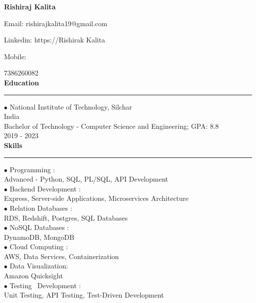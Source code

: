 \documentclass[11pt,a4paper]{article}
\renewcommand{\section}[1]{%
  \vspace{12pt}%
  {\large\bfseries #1}%
  \vspace{6pt}%
  \hrule%
  \vspace{6pt}%
}
\begin{document}
\begin{center}\Huge\textbf{Rishiraj Kalita}\\[0.5cm]\end{center}

\begin{center}Email: rishirajkalita19@gmail.com\end{center}
\begin{center}Linkedin: https://Rishirak Kalita\end{center}
\begin{center}Mobile:\end{center}
7386260082\\[0.2cm]
\section{Education}

\noindent $\bullet$ National Institute of Technology, Silchar\\[0.2cm]
India\\[0.2cm]
Bachelor of Technology - Computer Science and Engineering; GPA: 8.8\\[0.2cm]
2019 - 2023\\[0.2cm]
\section{Skills}

\noindent $\bullet$ Programming :\\[0.2cm]
Advanced - Python, SQL, PL/SQL, API Development\\[0.2cm]
\noindent $\bullet$ Backend Development :\\[0.2cm]
Express, Server-side Applications, Microservices Architecture\\[0.2cm]
\noindent $\bullet$ Relation Databases :\\[0.2cm]
RDS, Redshift, Postgres, SQL Databases\\[0.2cm]
\noindent $\bullet$ NoSQL Databases :\\[0.2cm]
DynamoDB, MongoDB\\[0.2cm]
\noindent $\bullet$ Cloud Computing :\\[0.2cm]
AWS, Data Services, Containerization\\[0.2cm]
\noindent $\bullet$ Data Visualization:\\[0.2cm]
Amazon Quicksight\\[0.2cm]
\noindent $\bullet$ Testing \ Development :\\[0.2cm]
Unit Testing, API Testing, Test-Driven Development\\[0.2cm]
\end{document}
